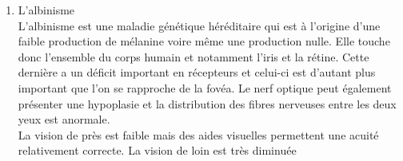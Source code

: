 \documentclass[french,a4paper]{report}
\begin{document}
{\begin{enumerate}
\begin{figure}[H]
\begin{minipage}{0.5\textwidth}
\centering
Originale \\ \vspace{0.2cm}
\texttt{[image: ./images/pathologies/original.jpg]}
\end{minipage}
\begin{minipage}{0.5\textwidth}
\centering
Rétinopathie pigmentaire\vspace{0.2cm}
\texttt{[image: ./images/pathologies/retinitePigmentaire.jpg]}
\end{minipage}
\begin{minipage}{0.5\textwidth}
\centering
\vspace{0.4cm}Originale \enquote{texte}\\ \vspace{0.1cm}
\texttt{[image: ./images/pathologies/originalText.jpg]}
\end{minipage}
\begin{minipage}{0.5\textwidth}
\centering
\vspace{0.4cm}Rétinopathie pigmentaire \enquote{texte}\vspace{0.1cm}
\texttt{[image: ./images/pathologies/retinitePigmentaireText.jpg]}
\end{minipage}
\caption{Impact de la rétinite pigmentaire}
\end{figure}
La rétinopathie pigmentaire engendre une diminution progressive de la vision, une perte de la vision périphérique, une diminution des contrastes, une augmentation de la sensibilité à la lumière. L'adaptation au changement de lumière est difficile et procure une perte de la vision nocturne. Cette baisse progressive se termine une fois la cécité atteinte.
\newline
\item L'albinisme \\
L'albinisme est une maladie génétique héréditaire qui est à
l'origine d'une faible production de mélanine voire même une
production nulle. Elle touche donc l'ensemble du corps humain et
notamment l'iris et la rétine. Cette dernière a un déficit
important en récepteurs et celui-ci est d'autant plus important que
l'on se rapproche de la fovéa. Le nerf optique peut également
présenter une hypoplasie et la distribution des fibres nerveuses
entre les deux yeux est anormale. \\
La vision de près est faible mais des aides visuelles permettent une
acuité relativement correcte. La vision de loin est très diminuée

\end{enumerate}}
\end{document}
